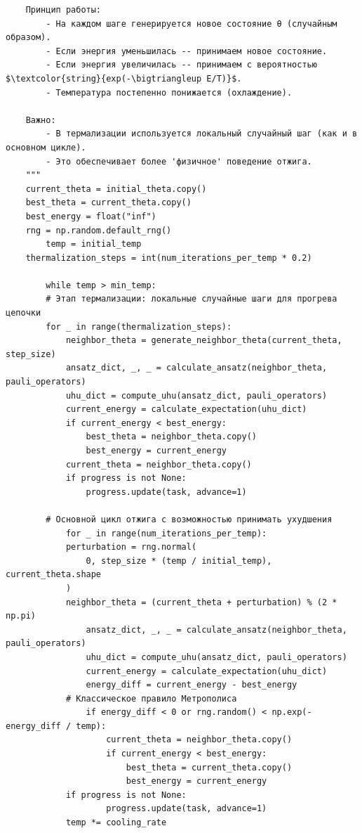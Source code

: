 \documentclass[a4paper]{report}
\begin{document}
\begin{lstlisting}
    Принцип работы:
        - На каждом шаге генерируется новое состояние θ (случайным образом).
        - Если энергия уменьшилась -- принимаем новое состояние.
        - Если энергия увеличилась -- принимаем с вероятностью $\textcolor{string}{exp(-\bigtriangleup E/T)}$.
        - Температура постепенно понижается (охлаждение).

    Важно:
        - В термализации используется локальный случайный шаг (как и в основном цикле).
        - Это обеспечивает более 'физичное' поведение отжига.
    """
    current_theta = initial_theta.copy()
    best_theta = current_theta.copy()
    best_energy = float("inf")
    rng = np.random.default_rng()
        temp = initial_temp
    thermalization_steps = int(num_iterations_per_temp * 0.2)

        while temp > min_temp:
        # Этап термализации: локальные случайные шаги для прогрева цепочки
        for _ in range(thermalization_steps):
            neighbor_theta = generate_neighbor_theta(current_theta, step_size)
            ansatz_dict, _, _ = calculate_ansatz(neighbor_theta, pauli_operators)
            uhu_dict = compute_uhu(ansatz_dict, pauli_operators)
            current_energy = calculate_expectation(uhu_dict)
            if current_energy < best_energy:
                best_theta = neighbor_theta.copy()
                best_energy = current_energy
            current_theta = neighbor_theta.copy()
            if progress is not None:
                progress.update(task, advance=1)

        # Основной цикл отжига с возможностью принимать ухудшения
            for _ in range(num_iterations_per_temp):
            perturbation = rng.normal(
                0, step_size * (temp / initial_temp), current_theta.shape
            )
            neighbor_theta = (current_theta + perturbation) % (2 * np.pi)
                ansatz_dict, _, _ = calculate_ansatz(neighbor_theta, pauli_operators)
                uhu_dict = compute_uhu(ansatz_dict, pauli_operators)
                current_energy = calculate_expectation(uhu_dict)
                energy_diff = current_energy - best_energy
            # Классическое правило Метрополиса
                if energy_diff < 0 or rng.random() < np.exp(-energy_diff / temp):
                    current_theta = neighbor_theta.copy()
                    if current_energy < best_energy:
                        best_theta = current_theta.copy()
                        best_energy = current_energy
            if progress is not None:
                    progress.update(task, advance=1)
            temp *= cooling_rate


\end{lstlisting}
\end{document}
